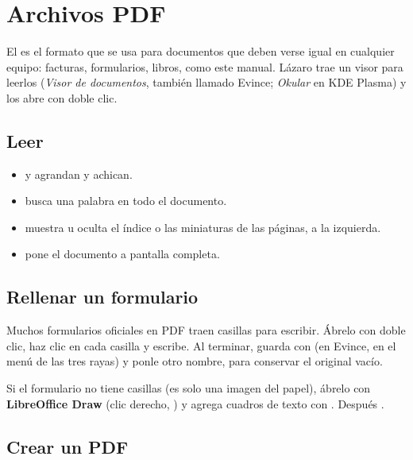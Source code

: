 \chapter{Archivos PDF}\label{cap:09-pdf}

El  es el formato que se usa para documentos que deben verse
igual en cualquier equipo: facturas, formularios, libros, como este
manual. Lázaro trae un visor para leerlos (\emph{Visor de documentos},
también llamado Evince; \emph{Okular} en KDE Plasma) y los abre con doble
clic.

\section{Leer}


\begin{itemize}
  \item \keys{\ctrl + +} y \keys{\ctrl + -} agrandan y achican.
  \item {} busca una palabra en todo el documento.
  \item {} muestra u oculta el índice o las miniaturas de las
        páginas, a la izquierda.
  \item {} pone el documento a pantalla completa.
\end{itemize}

\section{Rellenar un formulario}

Muchos formularios oficiales en PDF traen casillas para escribir. Ábrelo
con doble clic, haz clic en cada casilla y escribe. Al terminar, guarda
con  (en Evince, en el menú de las tres rayas) y
ponle otro nombre, para conservar el original vacío.

\begin{consejo}
Si el formulario no tiene casillas (es solo una imagen del papel), ábrelo
con \textbf{LibreOffice Draw} (clic derecho, ) y agrega
cuadros de texto con . Después
.
\end{consejo}

\section{Crear un PDF}

